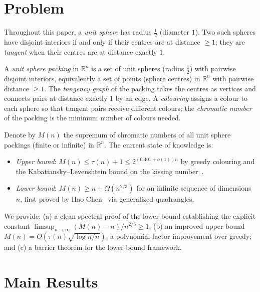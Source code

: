 \documentclass{article}
\theoremstyle{definition}
\begin{document}
\section*{Problem}

Throughout this paper, a \emph{unit sphere} has radius $\tfrac{1}{2}$ (diameter $1$).  Two such spheres have disjoint interiors if and only if their centres are at distance $\ge 1$; they are \emph{tangent} when their centres are at distance exactly $1$.

A \emph{unit sphere packing} in $\mathbb{R}^n$ is a set of unit spheres (radius $\tfrac{1}{2}$) with pairwise disjoint interiors, equivalently a set of points (sphere centres) in $\mathbb{R}^n$ with pairwise distance $\ge 1$. The \emph{tangency graph} of the packing takes the centres as vertices and connects pairs at distance exactly $1$ by an edge. A \emph{colouring} assigns a colour to each sphere so that tangent pairs receive different colours; the \emph{chromatic number} of the packing is the minimum number of colours needed.

Denote by $M(n)$ the supremum of chromatic numbers of all unit sphere packings (finite or infinite) in $\mathbb{R}^n$. The current state of knowledge is:
\begin{itemize}
  \item \textit{Upper bound}: $M(n)\le \tau(n)+1\le 2^{(0.401+o(1))n}$ by greedy colouring and the Kabatiansky--Levenshtein bound on the kissing number~\cite{KL1978}.
  \item \textit{Lower bound}: $M(n)\ge n+\Omega(n^{2/3})$ for an infinite sequence of dimensions $n$, first proved by Hao Chen~\cite{Chen2015} via generalized quadrangles.
\end{itemize}
We provide: (a) a clean spectral proof of the lower bound establishing the explicit constant $\limsup_{n\to\infty}(M(n)-n)/n^{2/3}\ge 1$; (b) an improved upper bound $M(n)=O(\tau(n)\sqrt{\log n/n})$, a polynomial-factor improvement over greedy; and (c) a barrier theorem for the lower-bound framework.

\section*{Main Results}











\end{document}
